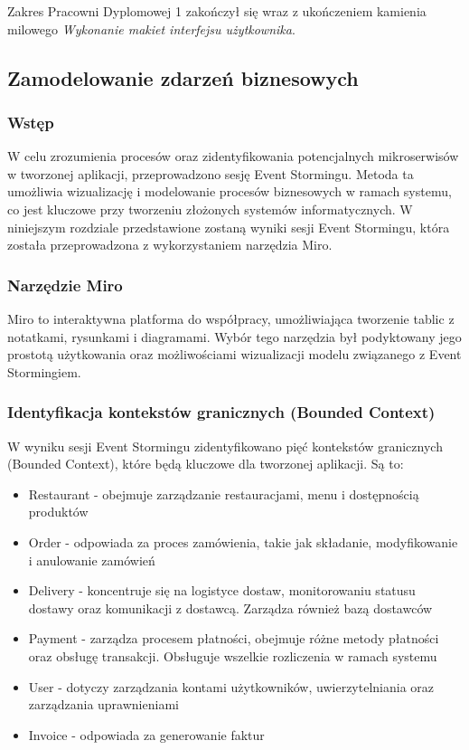 Zakres Pracowni Dyplomowej 1 zakończył się wraz z ukończeniem kamienia milowego \textit{Wykonanie makiet interfejsu użytkownika}.

\subsection{Zamodelowanie zdarzeń biznesowych}

\subsubsection{Wstęp}

W celu zrozumienia procesów oraz zidentyfikowania potencjalnych mikroserwisów w tworzonej aplikacji, przeprowadzono sesję Event Stormingu. Metoda ta umożliwia wizualizację i modelowanie procesów biznesowych w ramach systemu, co jest kluczowe przy tworzeniu złożonych systemów informatycznych. W niniejszym rozdziale przedstawione zostaną wyniki sesji Event Stormingu, która została przeprowadzona z wykorzystaniem narzędzia Miro.

\subsubsection{Narzędzie Miro}

Miro to interaktywna platforma do współpracy, umożliwiająca tworzenie tablic z notatkami, rysunkami i diagramami. Wybór tego narzędzia był podyktowany jego prostotą użytkowania oraz możliwościami wizualizacji modelu związanego z Event Stormingiem.

\subsubsection{Identyfikacja kontekstów granicznych (Bounded Context)}

W wyniku sesji Event Stormingu zidentyfikowano pięć kontekstów granicznych (Bounded Context), które będą kluczowe dla tworzonej aplikacji. Są to:

\begin{itemize}
    \item Restaurant - obejmuje zarządzanie restauracjami, menu i dostępnością produktów
    \item Order - odpowiada za proces zamówienia, takie jak składanie, modyfikowanie i anulowanie zamówień
    \item Delivery - koncentruje się na logistyce dostaw, monitorowaniu statusu dostawy oraz komunikacji z dostawcą. Zarządza również bazą dostawców
    \item Payment - zarządza procesem płatności, obejmuje różne metody płatności oraz obsługę transakcji. Obsługuje wszelkie rozliczenia w ramach systemu
    \item User - dotyczy zarządzania kontami użytkowników, uwierzytelniania oraz zarządzania uprawnieniami
    \item Invoice - odpowiada za generowanie faktur
\end{itemize}

